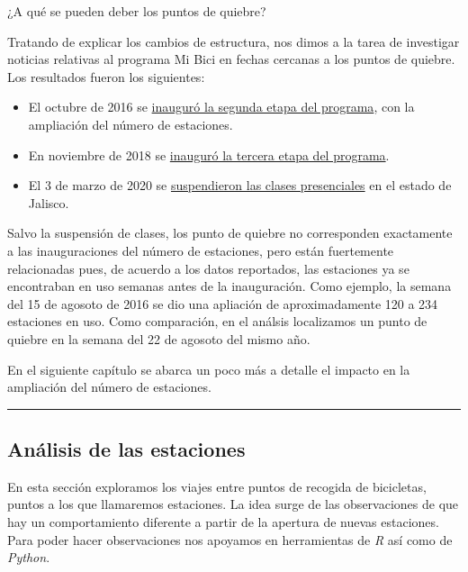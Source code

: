 \documentclass[
]{article}
\begin{document}
¿A qué se pueden deber los puntos de quiebre?

Tratando de explicar los cambios de estructura, nos dimos a la tarea de
investigar noticias relativas al programa Mi Bici en fechas cercanas a
los puntos de quiebre. Los resultados fueron los siguientes:

\begin{itemize}
\item
  El octubre de 2016 se
  \href{https://www.informador.mx/Jalisco/Inauguran-segunda-etapa-de-MiBici-20161027-0035.html}{inauguró
  la segunda etapa del programa}, con la ampliación del número de
  estaciones.
\item
  En noviembre de 2018 se
  \href{https://www.eloccidental.com.mx/local/inauguran-tercera-etapa-de-mibici-2714371.html}{inauguró
  la tercera etapa del programa}.
\item
  El 3 de marzo de 2020 se
  \href{https://www.animalpolitico.com/2020/03/jalisco-suspende-clases-universidades-eventos-masivos-coronavirus/}{suspendieron
  las clases presenciales} en el estado de Jalisco.
\end{itemize}

Salvo la suspensión de clases, los punto de quiebre no corresponden
exactamente a las inauguraciones del número de estaciones, pero están
fuertemente relacionadas pues, de acuerdo a los datos reportados, las
estaciones ya se encontraban en uso semanas antes de la inauguración.
Como ejemplo, la semana del 15 de agosoto de 2016 se dio una apliación
de aproximadamente 120 a 234 estaciones en uso. Como comparación, en el
análsis localizamos un punto de quiebre en la semana del 22 de agosoto
del mismo año.

En el siguiente capítulo se abarca un poco más a detalle el impacto en
la ampliación del número de estaciones.

\begin{center}\rule{0.5\linewidth}{0.5pt}\end{center}

\newpage
\hypertarget{anuxe1lisis-de-las-estaciones}{%
\subsection{Análisis de las
estaciones}\label{anuxe1lisis-de-las-estaciones}}

En esta sección exploramos los viajes entre puntos de recogida de
bicicletas, puntos a los que llamaremos estaciones. La idea surge de las
observaciones de que hay un comportamiento diferente a partir de la
apertura de nuevas estaciones. Para poder hacer observaciones nos
apoyamos en herramientas de \emph{R} así como de \emph{Python}.
\end{document}
